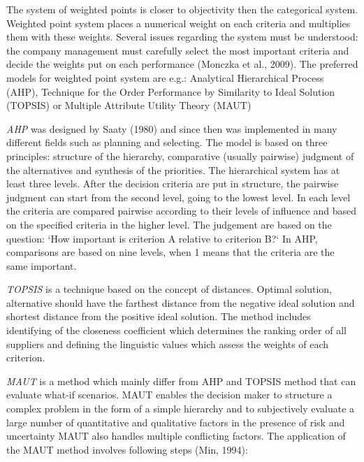 \documentclass[oneside,12pt]{article}%
\begin{document}
The system of weighted points is closer to objectivity then the categorical system. Weighted point system places a numerical weight on each criteria and multiplies them with these weights. Several issues regarding the system must be understood: the company management must carefully select the most important criteria and decide the weights put on each performance (Monczka et al., 2009). The preferred models for weighted point system are e.g.: Analytical Hierarchical Process (AHP), Technique for the Order Performance by Similarity to Ideal Solution (TOPSIS) or Multiple Attribute Utility Theory (MAUT) \par
\emph{AHP} was designed by Saaty (1980) and since then was implemented in many different fields such as planning and selecting. The model is based on three principles: structure of the hierarchy, comparative (usually pairwise) judgment of the alternatives and synthesis of the priorities. The hierarchical system has at least three levels. After the decision criteria are put in structure, the pairwise judgment can start from the second level, going to the lowest level. In each level the criteria are compared pairwise according to their levels of influence and based on the specified criteria in the higher level. The judgement are based on the question: ‘How important is criterion A relative to criterion B?‘ In AHP, comparisons are based on nine levels, when 1 means that the criteria are the same important. \par
\emph{TOPSIS} is a technique based on the concept of distances. Optimal solution, alternative should have the farthest distance from the negative ideal solution and shortest distance from the positive ideal solution. The method includes identifying of the closeness coefficient which determines the ranking order of all suppliers and defining the linguistic values which assess the weights of each criterion. \par
\emph{MAUT} is a method which mainly differ from AHP and TOPSIS method that can evaluate what-if scenarios. MAUT enables the decision maker to structure a complex problem in the form of a simple hierarchy and to subjectively evaluate a large number of quantitative and qualitative factors in the presence of risk and uncertainty MAUT also handles multiple conflicting factors. The application of the MAUT method involves following steps (Min, 1994):
\end{document}
